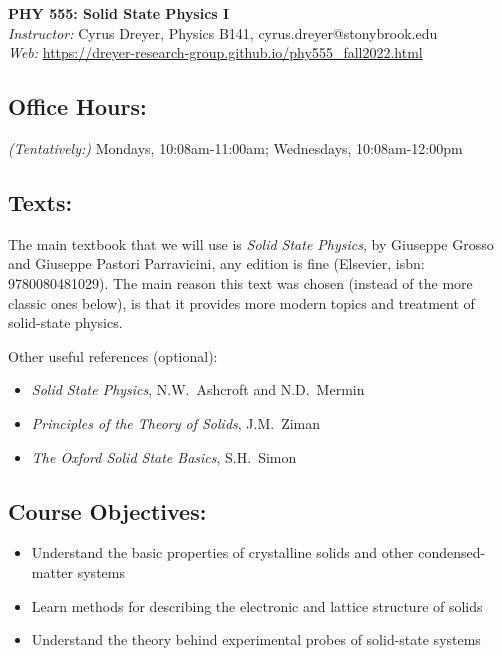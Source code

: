 \documentclass[11pt]{article}
\newenvironment{itemsquish}
  { \begin{itemize}
    \addtolength{\itemsep}{-0.25\baselineskip}
    \addtolength{\baselineskip}{-0.25\baselineskip} }
  { \end{itemize} }
\begin{document}
\begin{center}
{\LARGE \sffamily \bfseries PHY 555: Solid State Physics I} \\[3mm]
{\em  Instructor:} Cyrus Dreyer, Physics B141, cyrus.dreyer@stonybrook.edu \\
{\em Web:}\/ \url{https://dreyer-research-group.github.io/phy555_fall2022.html}
\end{center}

\subsection*{Office Hours:}

\textit{(Tentatively:)} Mondays, 10:08am-11:00am; Wednesdays, 10:08am-12:00pm

\subsection*{Texts:}

The main textbook that we will use is \textit{Solid State Physics}, by Giuseppe Grosso and Giuseppe Pastori Parravicini, any edition is fine (Elsevier,  isbn: 9780080481029). The main reason this text was chosen (instead of the more classic ones below), is that it provides more modern topics and treatment of solid-state physics. 

Other useful references (optional):
\begin{itemsquish}
\item {\em Solid State Physics}, N.W.~Ashcroft and  N.D.~Mermin
\item {\em Principles of the Theory of Solids},  J.M.~Ziman
\item {\em The Oxford Solid State Basics}, S.H.~Simon
\end{itemsquish}

\subsection*{Course Objectives: }

\begin{itemsquish}
\item Understand the basic properties of crystalline solids and other condensed-matter systems
\item Learn methods for describing the electronic and lattice structure of solids
\item Understand the theory behind experimental probes of solid-state systems
\end{itemsquish}
\end{document}
